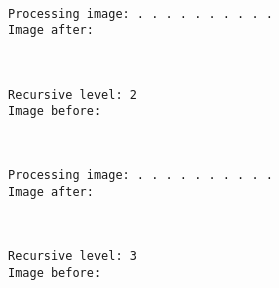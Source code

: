 \documentclass[11pt]{article}
\begin{document}
    \begin{center}
    \end{center}
    { \hspace*{\fill} \\}
    
    \begin{Verbatim}[commandchars=\\\{\}]
Processing image: . . . . . . . . . . 
Image after:

    \end{Verbatim}

    \begin{center}
    \end{center}
    { \hspace*{\fill} \\}
    
    \begin{Verbatim}[commandchars=\\\{\}]
Recursive level: 2
Image before:

    \end{Verbatim}

    \begin{center}
    \end{center}
    { \hspace*{\fill} \\}
    
    \begin{Verbatim}[commandchars=\\\{\}]
Processing image: . . . . . . . . . . 
Image after:

    \end{Verbatim}

    \begin{center}
    \end{center}
    { \hspace*{\fill} \\}
    
    \begin{Verbatim}[commandchars=\\\{\}]
Recursive level: 3
Image before:

    \end{Verbatim}
\end{document}
